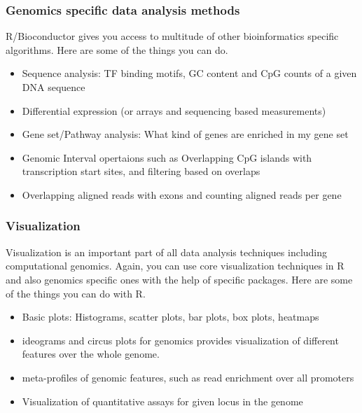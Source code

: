 \documentclass[12pt,]{krantz}
\providecommand{\tightlist}{%
  \setlength{\itemsep}{0pt}\setlength{\parskip}{0pt}}
\theoremstyle{definition}
\theoremstyle{definition}
\theoremstyle{definition}
\theoremstyle{remark}
\begin{document}
\hypertarget{genomics-specific-data-analysis-methods}{%
\subsubsection{Genomics specific data analysis
methods}\label{genomics-specific-data-analysis-methods}}

R/Bioconductor gives you access to multitude of other bioinformatics
specific algorithms. Here are some of the things you can do.

\begin{itemize}
\tightlist
\item
  Sequence analysis: TF binding motifs, GC content and CpG counts of a
  given DNA sequence
\item
  Differential expression (or arrays and sequencing based measurements)
\item
  Gene set/Pathway analysis: What kind of genes are enriched in my gene
  set
\item
  Genomic Interval opertaions such as Overlapping CpG islands with
  transcription start sites, and filtering based on overlaps
\item
  Overlapping aligned reads with exons and counting aligned reads per
  gene
\end{itemize}

\hypertarget{visualization}{%
\subsubsection{Visualization}\label{visualization}}

Visualization is an important part of all data analysis techniques
including computational genomics. Again, you can use core visualization
techniques in R and also genomics specific ones with the help of
specific packages. Here are some of the things you can do with R.

\begin{itemize}
\tightlist
\item
  Basic plots: Histograms, scatter plots, bar plots, box plots, heatmaps
\item
  ideograms and circus plots for genomics provides visualization of
  different features over the whole genome.
\item
  meta-profiles of genomic features, such as read enrichment over all
  promoters
\item
  Visualization of quantitative assays for given locus in the genome
\end{itemize}
\end{document}
